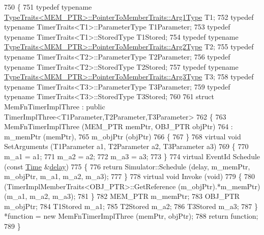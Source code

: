 \begin{DoxyCode}
750 \{
751   \textcolor{keyword}{typedef} \textcolor{keyword}{typename} \hyperlink{structTypeTraits}{TypeTraits<MEM\_PTR>::PointerToMemberTraits::Arg1Type}
       T1;
752   \textcolor{keyword}{typedef} \textcolor{keyword}{typename} TimerTraits<T1>::ParameterType T1Parameter;
753   \textcolor{keyword}{typedef} \textcolor{keyword}{typename} TimerTraits<T1>::StoredType T1Stored;
754   \textcolor{keyword}{typedef} \textcolor{keyword}{typename} \hyperlink{structTypeTraits}{TypeTraits<MEM\_PTR>::PointerToMemberTraits::Arg2Type}
       T2;
755   \textcolor{keyword}{typedef} \textcolor{keyword}{typename} TimerTraits<T2>::ParameterType T2Parameter;
756   \textcolor{keyword}{typedef} \textcolor{keyword}{typename} TimerTraits<T2>::StoredType T2Stored;
757   \textcolor{keyword}{typedef} \textcolor{keyword}{typename} \hyperlink{structTypeTraits}{TypeTraits<MEM\_PTR>::PointerToMemberTraits::Arg3Type}
       T3;
758   \textcolor{keyword}{typedef} \textcolor{keyword}{typename} TimerTraits<T3>::ParameterType T3Parameter;
759   \textcolor{keyword}{typedef} \textcolor{keyword}{typename} TimerTraits<T3>::StoredType T3Stored;
760 
761   \textcolor{keyword}{struct }MemFnTimerImplThree : \textcolor{keyword}{public} TimerImplThree<T1Parameter,T2Parameter,T3Parameter>
762   \{
763     MemFnTimerImplThree (MEM\_PTR memPtr, OBJ\_PTR objPtr)
764       : m\_memPtr (memPtr),
765         m\_objPtr (objPtr)
766     \{
767     \}
768     \textcolor{keyword}{virtual} \textcolor{keywordtype}{void} SetArguments (T1Parameter a1, T2Parameter a2, T3Parameter a3)
769     \{
770       m\_a1 = a1;
771       m\_a2 = a2;
772       m\_a3 = a3;
773     \}
774     \textcolor{keyword}{virtual} EventId Schedule (\textcolor{keyword}{const} \hyperlink{namespacens3_1_1TracedValueCallback_a7ffd3e7c142ffe7c8a1d2db9b8de38ec}{Time} &\hyperlink{lte_2model_2fading-traces_2fading__trace__generator_8m_a7964e6aa8f61a9d28973c8267a606ad8}{delay})
775     \{
776       \textcolor{keywordflow}{return} Simulator::Schedule (delay, m\_memPtr, m\_objPtr, m\_a1, m\_a2, m\_a3);
777     \}
778     \textcolor{keyword}{virtual} \textcolor{keywordtype}{void} Invoke (\textcolor{keywordtype}{void})
779     \{
780       (TimerImplMemberTraits<OBJ\_PTR>::GetReference (m\_objPtr).*m\_memPtr)(m\_a1, m\_a2, m\_a3);
781     \}
782     MEM\_PTR m\_memPtr;
783     OBJ\_PTR m\_objPtr;
784     T1Stored m\_a1;
785     T2Stored m\_a2;
786     T3Stored m\_a3;
787   \} *\textcolor{keyword}{function} = \textcolor{keyword}{new} MemFnTimerImplThree (memPtr, objPtr);
788   \textcolor{keywordflow}{return} \textcolor{keyword}{function};
789 \}
\end{DoxyCode}


